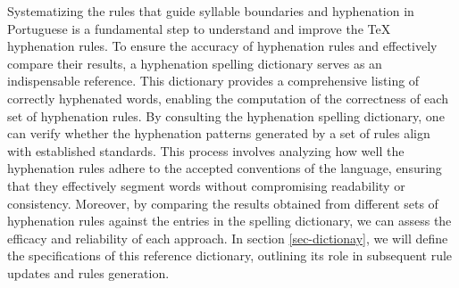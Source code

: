 Systematizing the rules that guide syllable boundaries and hyphenation in
Portuguese is a fundamental step to understand and improve the \TeX{}
hyphenation rules. To ensure the accuracy of hyphenation rules and effectively
compare their results, a hyphenation spelling dictionary serves as an
indispensable reference. This dictionary provides a comprehensive listing of
correctly hyphenated words, enabling the computation of the correctness of each
set of hyphenation rules. By consulting the hyphenation spelling dictionary,
one can verify whether the hyphenation patterns generated by a set of rules
align with established standards. This process involves analyzing how well the
hyphenation rules adhere to the accepted conventions of the language, ensuring
that they effectively segment words without compromising readability or
consistency. Moreover, by comparing the results obtained from different sets of
hyphenation rules against the entries in the spelling dictionary, we can assess
the efficacy and reliability of each approach. In section \ref{sec-dictionay},
we will define the specifications of this reference dictionary, outlining its
role in subsequent rule updates and rules generation.


